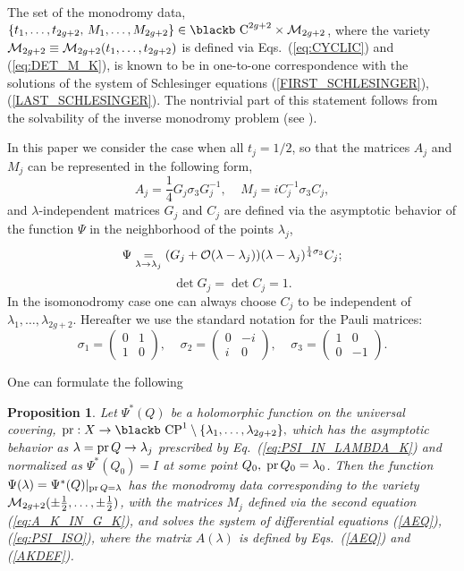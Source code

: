 \documentclass[11pt]{article}
\def\underset#1#2{\mathrel{\mathop{#2}\limits_{#1}}}
\def\Bbb#1{\hbox{\blackb #1}}
\newtheorem{proposition}{Proposition}[section]
\def\l{\lambda}
\begin{document}
The set of the monodromy data, $\{t_1,\dots,t_{2g+2},
\,M_1,\dots,M_{2g+2}\}\in\Bbb C^{2g+2}\times{\cal M}_{2g+2}$, where
the variety 
${\cal M}_{2g+2}\equiv{\cal M}_{2g+2}(t_1,\dots,t_{2g+2})$ is defined 
via Eqs.~(\ref{eq:CYCLIC}) and (\ref{eq:DET_M_K}), 
is known to be in one-to-one correspondence with the solutions of the
system of Schlesinger equations (\ref{FIRST_SCHLESINGER}), 
(\ref{LAST_SCHLESINGER}). The nontrivial part of this statement follows 
from the solvability of the inverse monodromy problem (see \cite{B}).
 
In this paper we consider the case when all 
$t_j=1/2$, so that the matrices $A_j$ and $M_j$ 
can be represented in the following form,
\begin{equation}
  \label{eq:A_K_IN_G_K}
  A_j=\frac 14G_j\sigma_3 G_j^{-1},\;\;\;\;M_j=iC_j^{-1}\sigma_3 C_j,
\end{equation}
and $\l$-independent matrices $ G_j$ and $C_j$ are defined via the 
asymptotic behavior of the function $\Psi$ in the neighborhood of 
the points $\lambda_j$,
\begin{equation}
  \label{eq:PSI_IN_LAMBDA_K}
\Psi\underset{\lambda\to\lambda_j}= 
(G_j+{\cal O}(\lambda-\lambda_j))(\lambda-\lambda_j)^{\frac 14\sigma_3}C_j;
\end{equation}
$$
\det G_j=\det C_j=1.
$$
In the isomonodromy case one can always choose $C_j$ to be independent of
$\lambda_1,\dots,\lambda_{2g+2}$. Hereafter we use the standard notation 
for the Pauli matrices:
$$
\sigma_1=
\left(\begin{array}{cc}
0&1\\
1&0
\end{array}\right),\;\;\;\;
\sigma_2=
\left(\begin{array}{cc}
0&-i\\
i&0
\end{array}\right),\;\;\;\;
\sigma_3=
\left(\begin{array}{cc}
1&0\\
0&-1
\end{array}\right).
$$

One can formulate the following 
\begin{proposition}\label{GENERAL}
Let $\Psi^*(Q)$ be a holomorphic function on the universal covering,
${\rm pr:}\;X\rightarrow 
\Bbb{CP}^1\setminus\{\lambda_1,\dots,\lambda_{2g+2}\},$
which has the asymptotic behavior as $\lambda={\rm pr}\,Q\to\lambda_j$ 
prescribed by
Eq.~{\rm (\ref{eq:PSI_IN_LAMBDA_K})} and normalized as $\Psi^*(Q_0)=I$ at some
point $Q_0,\;{\rm pr}\,Q_0=\lambda_0$. Then the function 
$\Psi(\lambda)=\Psi^*(Q)\vert_{{\rm pr}\,Q=\lambda}$ has the monodromy data
corresponding to the variety 
${\cal M}_{2g+2}(\pm\frac 12,\dots,\pm\frac 12)$, with the matrices $M_j$
defined via the second equation {\rm (\ref{eq:A_K_IN_G_K})}, and solves the
system  of differential equations {\rm (\ref{AEQ}), (\ref{eq:PSI_ISO})}, 
where the matrix $A(\lambda)$ is defined by Eqs.~{\rm (\ref{AEQ})} and 
{\rm (\ref{AKDEF})}.
\end{proposition}
\end{document}
